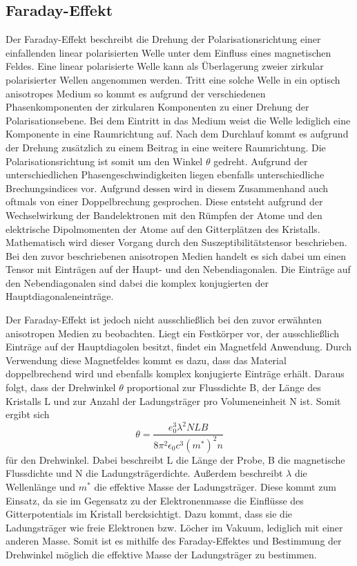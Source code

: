 \subsection{Faraday-Effekt}
Der Faraday-Effekt beschreibt die Drehung der Polarisationsrichtung einer einfallenden linear
polarisierten Welle unter dem Einfluss eines magnetischen Feldes. Eine linear polarisierte Welle
kann als Überlagerung zweier zirkular polarisierter Wellen angenommen werden. Tritt eine solche Welle in
ein optisch anisotropes Medium so kommt es aufgrund der verschiedenen Phasenkomponenten der zirkularen
Komponenten zu einer Drehung der Polarisationsebene. Bei dem Eintritt in das Medium weist die Welle
lediglich eine Komponente in eine Raumrichtung auf. Nach dem Durchlauf kommt es aufgrund der Drehung
zusätzlich zu einem Beitrag in eine weitere Raumrichtung. Die Polarisationsrichtung ist somit um den
Winkel $\theta$ gedreht. Aufgrund der unterschiedlichen Phasengeschwindigkeiten liegen ebenfalls
unterschiedliche Brechungsindices vor. Aufgrund dessen wird in diesem Zusammenhand auch oftmals von einer
Doppelbrechung gesprochen. Diese entsteht aufgrund der
Wechselwirkung der Bandelektronen mit den Rümpfen der Atome und
den elektrische Dipolmomenten der Atome auf den Gitterplätzen des Kristalls. \\
Mathematisch wird dieser Vorgang durch den Suszeptibilitätstensor beschrieben. Bei den zuvor beschriebenen
anisotropen Medien handelt es sich dabei um einen Tensor mit Einträgen auf der Haupt- und den Nebendiagonalen.
Die Einträge auf den Nebendiagonalen sind dabei die komplex konjugierten der Hauptdiagonaleneinträge. \\
\par
Der Faraday-Effekt ist jedoch nicht ausschließlich bei den zuvor erwähnten anisotropen Medien zu beobachten.
Liegt ein Festkörper vor, der ausschließlich Einträge auf der Hauptdiagolen besitzt, findet ein
Magnetfeld Anwendung. Durch Verwendung diese Magnetfeldes kommt es dazu, dass das Material doppelbrechend wird
und ebenfalls komplex konjugierte Einträge erhält. Daraus folgt, dass der Drehwinkel $\theta$
proportional zur Flussdichte B, der Länge des Kristalls L und zur Anzahl der Ladungsträger pro Volumeneinheit N
ist. Somit ergibt sich
\begin{equation}
    \theta = \frac{e_0^3 \lambda ^2 N L B}{8 \pi^2 \epsilon_0 c^3 (m^*)^2 n}
    \label{eqn:effmass}
\end{equation} \noindent
für den Drehwinkel. Dabei beschreibt L die Länge der Probe, B die magnetische Flussdichte und N die
Ladungsträgerdichte. Außerdem beschreibt $\lambda$ die Wellenlänge und $m^*$ die effektive Masse der
Ladungsträger. Diese kommt zum Einsatz, da sie im Gegensatz zu der Elektronenmasse die Einflüsse des
Gitterpotentials im Kristall bercksichtigt. Dazu kommt, dass sie die Ladungsträger wie freie Elektronen bzw.
Löcher im Vakuum, lediglich mit einer anderen Masse. Somit ist es mithilfe des Faraday-Effektes und Bestimmung
der Drehwinkel möglich die effektive Masse der Ladungsträger zu bestimmen.

